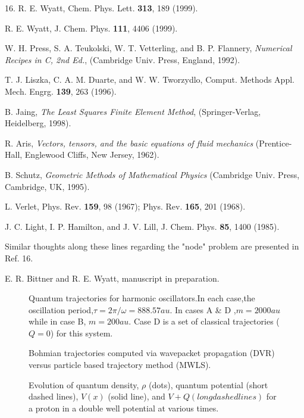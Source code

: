 \begin{thebibliography}{10}
16. R. E. Wyatt, Chem. Phys. Lett. {\bf 313}, 189  (1999).

R. E. Wyatt, J. Chem. Phys. {\bf  111}, 4406 (1999).

W. H. Press, S. A. Teukolski, W. T. Vetterling, and B. P. Flannery,
{\em Numerical Recipes in C, 2nd Ed.}, (Cambridge Univ. Press, 
England, 1992).

T. J. Liszka, C. A. M. Duarte, and W. W. Tworzydlo, Comput.  
Methods Appl.  Mech.  Engrg.  {\bf 139}, 263 (1996).  

B. Jaing, { \em The Least Squares Finite Element Method}, 
(Springer-Verlag, Heidelberg, 1998).

R. Aris, { \em Vectors, tensors, and the basic equations of fluid 
mechanics }(Prentice-Hall, Englewood Cliffs, New Jersey, 1962).


B. Schutz, { \em  Geometric Methods of Mathematical Physics} 
(Cambridge Univ.  Press, Cambridge, UK, 1995).

L. Verlet, Phys. Rev. {\bf 159}, 98 (1967); Phys. Rev. {\bf 165}, 201 (1968).

 J. C. Light, I. P. Hamilton, and J. V. Lill,  J. Chem. Phys.  {\bf 85}, 1400 (1985).

Similar thoughts along these lines regarding the "node" problem are presented in Ref. 16.

E. R. Bittner and R. E. Wyatt, manuscript in preparation. 
\end{thebibliography}


\begin{figure}
 \caption{Quantum trajectories for harmonic oscillators.In each 
 case,the oscillation period,$\tau =2 \pi/\omega =888.57 au$. 
 In cases A \&{} D ,$m=2000 au$ while in case B, 
 $m =200 au$.  Case D is a set of classical trajectories ($Q=0$) 
 for this system.  }
\end{figure}

\begin{figure}
\caption{ Bohmian trajectories computed via wavepacket propagation 
(DVR) versus particle based trajectory method (MWLS).}
\end{figure}

\begin{figure}
\caption{ Evolution of quantum density, $\rho$ (dots), quantum 
potential (short dashed lines),  $V(x)$ (solid line), and $V+Q (long 
dashed lines)$ 
for a proton in a double well potential at various times.  } 
\end{figure}


